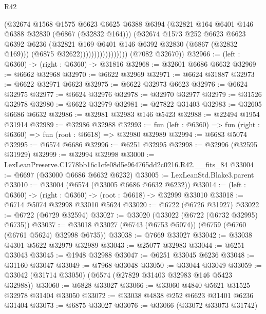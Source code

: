 \begin{lexlean}{R42}
\begin{coremodule}
{                                  (@32674
                                    @1568
                                    @1575
                                    @6623
                                    @6625
                                    @6388
                                    @6394
                                    (@32821 @164 @6401 @146 @6388 @32830 (@6867 (@32832 @164)))
                                    (@32674
                                      @1573
                                      @252
                                      @6623
                                      @6623
                                      @6392
                                      @6236
                                      (@32821 @169 @6401 @146 @6392 @32830 (@6867 (@32832 @169)))
                                      (@6875 @32622)))))))))))))))))
      (@7082 @32670))
@32966 := (left : @6360) -> (right : @6360) -> @31816
@32968 := @32601 @6686 @6632
@32969 := @6662 @32968
@32970 := @6622 @32969
@32971 := @6624 @31887
@32973 := @6622 @32971 @6623
@32975 := @6622 @32973 @6623
@32976 := @6624 @32975
@32977 := @6624 @32976
@32978 := @32970 @32977
@32979 := @31526 @32978
@32980 := @6622 @32979
@32981 := @27822 @31403
@32983 := @32605 @6686 @6632
@32986 := @32981 @32983 @146 @5423
@32988 := @22494 @1954 @31914
@32989 := @32986 @32988
@32993 := fun (left : @6360) => fun (right : @6360) => fun (root : @6618) => @32980 @32989
@32994 := @6683 @5074
@32995 := @6574 @6686
@32996 := @6251 @32995
@32998 := @32996 (@32595 @31929)
@32999 := @32994 @32998
@33000 := LexLeanPreserve.C1778bb16c1cfe08d5e964765dd2c0216.R42.__fits_84
@33004 := @6697 (@33000 @6686 @6632 @6232)
@33005 := LexLeanStd.Blake3.parent
@33010 := @33004 (@6574 (@33005 @6686 @6632 @6232))
@33014 := (left : @6360) -> (right : @6360) -> (root : @6618) -> @32999 @33010
@33018 := @6714 @5074 @32998 @33010 @5624
@33020 := @6722 (@6726 @31927)
@33022 := @6722 (@6729 @32594)
@33027 := @33020 (@33022 (@6722 (@6732 @32995) @6735))
@33037 := @33018 @33027 (@6743 (@6753 @5074)) (@6759 (@6760 (@6761 @5624) @32998 @6735))
@33038 := @7669 @33027
@33042 := @33038 @4301 @5622 @32979 @32989
@33043 := @25077 @32983
@33044 := @6251 @33043
@33045 := @1948 @32988
@33047 := @6251 @33045 @6236
@33048 := @31160 @33047
@33049 := @7968 @33048
@33050 := @33044 @33049
@33059 := @33042 (@31714 @33050) (@6574 (@27829 @31403 @32983 @146 @5423 @32988))
@33060 := @6828 @33027
@33066 := @33060 @4840 @5621 @31525 @32978 @31404 @33050
@33072 := @33038 @4838 @252 @6623 @31401 @6236 @31404
@33073 := @6875 @33027
@33076 := @33066 (@33072 @33073 @31742)
}
\end{coremodule}
\end{lexlean}
